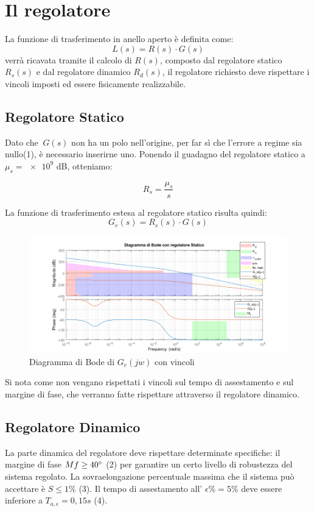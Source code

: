 \documentclass{article}
\begin{document}
\section{Il regolatore}
La funzione di trasferimento in anello aperto è definita come:
\[ L(s) = R(s) \cdot G(s)  \]
verrà ricavata tramite il calcolo di $R(s)$, composto dal regolatore statico $R_s(s)$ e dal regolatore dinamico $R_d(s)$, il regolatore richiesto deve rispettare i vincoli imposti ed essere fisicamente realizzabile.
\subsection{Regolatore Statico}

Dato che $\ G(s)$ non ha un polo nell'origine, per far sì che l'errore a regime sia nullo(1), è necessario inserirne uno. Ponendo il guadagno del regolatore statico a $ \mu_s =\num{e9}$ dB, otteniamo:

\[ R_s = \frac{\mu_s}{s}  \]

\noindent
La funzione di trasferimento estesa al regolatore statico risulta quindi:
\[ G_e(s) = R_s(s) \cdot G(s) \]

\begin{figure}[!h]
\centering
\includegraphics[width=1\textwidth]{grafici/fig2.png}
\caption{\label{fig:orbit}Diagramma di Bode di $G_e(jw)$ con vincoli}
\end{figure}
\noindent
Si nota come non vengano rispettati i vincoli sul tempo di assestamento e sul margine di fase, che verranno fatte rispettare attraverso il regolatore dinamico.


\subsection{Regolatore Dinamico}
 La parte dinamica del regolatore deve rispettare determinate specifiche: il margine di fase $ Mf \geq 40\degree $ (2) per garantire un certo livello di robustezza del sistema regolato. 
La sovraelongazione percentuale massima che il sistema può accettare è $ S \leq 1\% $ (3). Il tempo di assestamento all' $ \epsilon\% = 5\%$ deve essere inferiore a $ T_{a,\epsilon}=0,15s $ (4).\\
\end{document}
